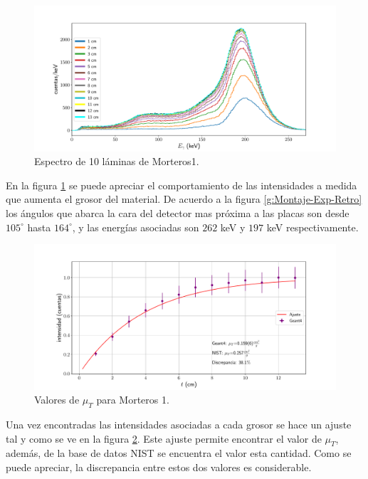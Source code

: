 \begin{figure}[H]
	\centering
	\includegraphics[width=1.0\linewidth]{Kap4/espectros_m1.pdf}
	\caption{Espectro de 10 láminas de Morteros1.}
	\label{fig:espectrosm1}
\end{figure}

En la figura \ref{fig:espectrosm1} se puede apreciar el comportamiento de las intensidades a medida que aumenta el grosor del material. De acuerdo a la figura \ref{g:Montaje-Exp-Retro} los ángulos que abarca la cara del detector mas próxima a las placas son desde $105^\circ$ hasta $164^\circ$, y las energías asociadas son $262$ keV y $197$ keV respectivamente. 
 
\begin{figure}[H]
	\centering
	\includegraphics[width=1.0\linewidth]{Kap4/mu_T-m1.pdf}
	\caption{Valores de $\mu_T$ para Morteros 1.}
	\label{fig:mut-m1}
\end{figure}

Una vez encontradas las intensidades asociadas a cada grosor se hace un ajuste tal y como se ve en la figura \ref{fig:mut-m1}. Este ajuste permite encontrar el valor de $\mu_T$, además, de la base de datos NIST se encuentra el valor esta cantidad. Como se puede apreciar, la discrepancia entre estos dos valores es considerable.


